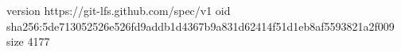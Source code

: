 version https://git-lfs.github.com/spec/v1
oid sha256:5de713052526e526fd9addb1d4367b9a831d62414f51d1eb8af5593821a2f009
size 4177
